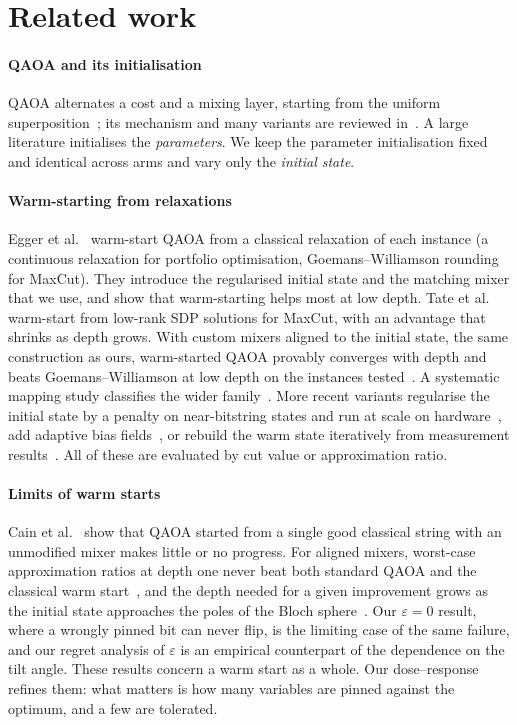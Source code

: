 \section{Related work}
\label{sec:related}

\paragraph{QAOA and its initialisation} QAOA alternates a cost and a mixing layer, starting from the uniform superposition~\cite{farhi2014qaoa}; its mechanism and many variants are reviewed in~\cite{zhou2020qaoa,blekos2024review}. A large literature initialises the \emph{parameters}. We keep the parameter initialisation fixed and identical across arms and vary only the \emph{initial state}.

\paragraph{Warm-starting from relaxations} Egger et al.~\cite{egger2021warm} warm-start QAOA from a classical relaxation of each instance (a continuous relaxation for portfolio optimisation, Goemans--Williamson rounding for MaxCut). They introduce the regularised initial state and the matching mixer that we use, and show that warm-starting helps most at low depth. Tate et al.~\cite{tate2023sdp} warm-start from low-rank SDP solutions for MaxCut, with an advantage that shrinks as depth grows. With custom mixers aligned to the initial state, the same construction as ours, warm-started QAOA provably converges with depth and beats Goemans--Williamson at low depth on the instances tested~\cite{tate2023custom}. A systematic mapping study classifies the wider family~\cite{truger2024mapping}. More recent variants regularise the initial state by a penalty on near-bitstring states and run at scale on hardware~\cite{he2026rws}, add adaptive bias fields~\cite{yu2025abqaoa}, or rebuild the warm state iteratively from measurement results~\cite{yuan2025iterative}. All of these are evaluated by cut value or approximation ratio.

\paragraph{Limits of warm starts} Cain et al.~\cite{cain2022stuck} show that QAOA started from a single good classical string with an unmodified mixer makes little or no progress. For aligned mixers, worst-case approximation ratios at depth one never beat both standard QAOA and the classical warm start~\cite{tate2024theory}, and the depth needed for a given improvement grows as the initial state approaches the poles of the Bloch sphere~\cite{tate2024poles}. Our $\varepsilon=0$ result, where a wrongly pinned bit can never flip, is the limiting case of the same failure, and our regret analysis of $\varepsilon$ is an empirical counterpart of the dependence on the tilt angle. These results concern a warm start as a whole. Our dose--response refines them: what matters is how many variables are pinned against the optimum, and a few are tolerated.

